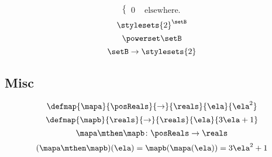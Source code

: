 \begin{forslides}
\begin{equation}
\begin{cases}
            0 & \text{ elsewhere}.
        \end{cases}
    \end{equation}
    \begin{equation}
        \label{eq:slides_session2_195}
        \stylesets{2}^\setB
    \end{equation}
    \begin{equation}
        \label{eq:slides_session2_196}
        \powerset \setB
    \end{equation}
    \begin{equation}
        \label{eq:slides_session2_197}
        \setB \to \stylesets{2}
    \end{equation}

    \subsection{Misc}

    \begin{equation}
        \label{eq:slides_session2_198}
        \defmap{\mapa}{\posReals}{\to}{\reals}{\ela}{\ela^2}
    \end{equation}
    \begin{equation}
        \label{eq:slides_session2_199}
        \defmap{\mapb}{\reals}{\to}{\reals}{\ela}{3\ela + 1}
    \end{equation}
    \begin{equation}
        \label{eq:slides_session2_200}
        \mapa \mthen \mapb \colon \posReals \to \reals
    \end{equation}
    \begin{equation}
        \label{eq:slides_session2_201}
        (\mapa \mthen \mapb)(\ela) = \mapb(\mapa(\ela)) = 3 \ela^2 + 1
    \end{equation}

\end{forslides}

